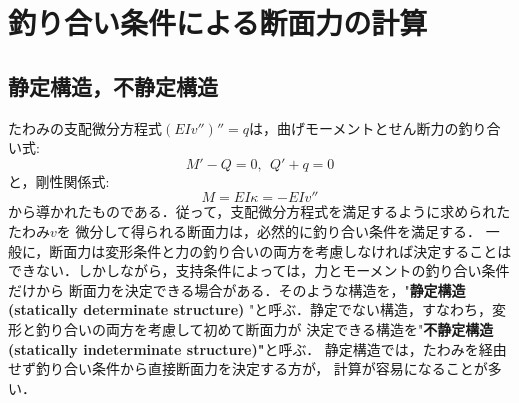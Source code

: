 \documentclass[10pt,a4j]{jbook}
\newlength{\minitwocolumn}
\begin{document}
\newcommand{\fat}[1]{\mbox{\boldmath $#1$}}
\newcommand{\D}{\partial}
\newcommand{\w}{\omega}
\newcommand{\ga}{\alpha}
\newcommand{\gb}{\beta}
\newcommand{\gx}{\xi}
\newcommand{\gz}{\zeta}
\newcommand{\vhat}[1]{\hat{\fat{#1}}}
\newcommand{\spc}{\vspace{0.7\baselineskip}}
\newcommand{\halfspc}{\vspace{0.3\baselineskip}}

\newcommand{\twofig}[2]
 {
   \begin{figure}
     \begin{minipage}[t]{\minitwocolumn}
         \begin{center}   #1
         \end{center}
     \end{minipage}
         \hspace{\columnsep}
     \begin{minipage}[t]{\minitwocolumn}
         \begin{center} #2
         \end{center}
     \end{minipage}
   \end{figure}
 }
\setcounter{chapter}{5}
\chapter{釣り合い条件による断面力の計算}
\section{静定構造，不静定構造}
たわみの支配微分方程式$(EIv'')''=q$は，曲げモーメントとせん断力の釣り合い式:
\begin{equation}
	M'-Q=0, \ \ Q'+q=0 
	\label{eqn:equiv_MQ}
\end{equation}
と，剛性関係式:
\begin{equation}
	M=EI\kappa = -EIv''
	\label{eqn:M_kpp}
\end{equation}
から導かれたものである．従って，支配微分方程式を満足するように求められたたわみ$v$を
微分して得られる断面力は，必然的に釣り合い条件を満足する．
一般に，断面力は変形条件と力の釣り合いの両方を考慮しなければ決定することは
できない．しかしながら，支持条件によっては，力とモーメントの釣り合い条件だけから
断面力を決定できる場合がある．そのような構造を，"{\bf 静定構造(statically determinate structure)
}"と呼ぶ．静定でない構造，すなわち，変形と釣り合いの両方を考慮して初めて断面力が
決定できる構造を"{\bf 不静定構造(statically indeterminate structure)"}と呼ぶ．
静定構造では，たわみを経由せず釣り合い条件から直接断面力を決定する方が，
計算が容易になることが多い．
\end{document}
